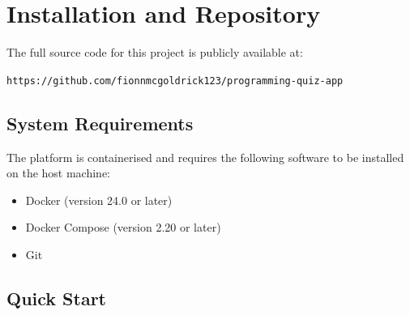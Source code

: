 \appendix

\chapter{Installation and Repository}

The full source code for this project is publicly available at:

\begin{center}
\texttt{https://github.com/fionnmcgoldrick123/programming-quiz-app}
\end{center}

\section*{System Requirements}

The platform is containerised and requires the following software
to be installed on the host machine:

\begin{itemize}
    \item Docker (version 24.0 or later)
    \item Docker Compose (version 2.20 or later)
    \item Git
\end{itemize}

\section*{Quick Start}

